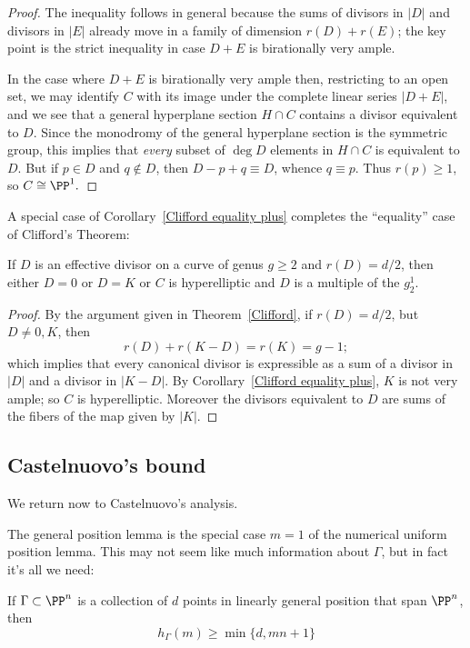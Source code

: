 \begin{proof}
 The inequality follows in general because the sums of divisors in $|D|$ and divisors in $|E|$ already move in 
 a family of dimension $r(D)+r(E)$; the key point is the strict inequality in case $D+E$ is birationally very ample.
 
In the case where $D+E$ is birationally very ample then, restricting to an open set,
we may identify $C$ with its image under the complete linear series $|D+E|$, and we see that a general hyperplane section $H\cap C$ contains a divisor equivalent to $D$. Since the monodromy of the general hyperplane section
is the symmetric group, this implies that \emph{every} subset of $\deg D$ elements in $H\cap C$ is
equivalent to $D$. But if $p\in D$ and $q\notin D$, then $D-p+q \equiv D$, whence $q\equiv p$. Thus
$r(p)\geq 1$, so $C\cong \PP^1.$
\end{proof}

A special case of Corollary~\ref{Clifford equality plus} completes the ``equality'' case of Clifford's Theorem:

\begin{corollary}\label{Clifford equality}
If $D$ is an effective divisor on a curve of genus $g\geq 2$ and $r(D) = d/2$, then either $D= 0$ or 
$D=K$ or $C$ is hyperelliptic and $D$ is a multiple of the $g^1_2$.
\end{corollary}

\begin{proof}
  By the argument given in Theorem~\ref{Clifford}, if $r(D) = d/2$, but $D\neq 0,K$, then
$$
r(D) + r(K-D) = r(K) = g-1;
$$
which implies that every canonical divisor is expressible as a sum of a divisor in $|D|$ and a divisor in $|K-D|$.
By Corollary~\ref{Clifford equality plus}, $K$ is not very ample; so $C$ is hyperelliptic. Moreover the
divisors equivalent to $D$ are sums of the fibers of the map given by $|K|$.
\end{proof}

\subsection{Castelnuovo's bound}

We return now to Castelnuovo's analysis.

The general position lemma is the special case $m=1$ of the numerical uniform position lemma. This may not seem like much information about $\Gamma$, but in fact it's all we need:

\begin{proposition}\label{min hilb}
If $\Gamma \subset \PP^n$ is a collection of $d$ points in linearly general position that span $\PP^n$, then 
$$
h_\Gamma(m) \geq \min\{d, mn+1\}
$$
\end{proposition}


